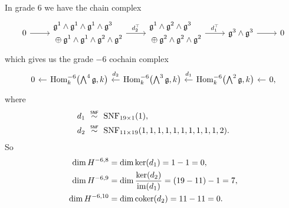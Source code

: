 In grade $6$ we have the chain complex
\[
  \begin{tikzcd}[ampersand replacement=\&]
    0 \ar[r] \& \begin{aligned} &\lie{g}^{1} \wedge \lie{g}^{1} \wedge \lie{g}^{1} \wedge \lie{g}^{3} \\ &\oplus \lie{g}^{1} \wedge \lie{g}^{1} \wedge \lie{g}^{2} \wedge \lie{g}^{2} \end{aligned} \ar[r,"d_{2}^{\top}"] \& \begin{aligned} &\lie{g}^{1} \wedge \lie{g}^{2} \wedge \lie{g}^{3} \\ &\oplus \lie{g}^{2} \wedge \lie{g}^{2} \wedge \lie{g}^{2} \end{aligned} \ar[r,"d_{1}^{\top}"] \& \lie{g}^{3} \wedge \lie{g}^{3} \ar[r] \& 0
  \end{tikzcd}
\]
which gives us the grade $-6$ cochain complex
\[
  \begin{tikzcd}[column sep=1em]
    0 & \ar[l] \Hom_{k}^{-6}\bigl( \bigwedge^{4}\lie{g}, k \bigr) & \ar[l,"d_{2}"' {yshift=2pt}] \Hom_{k}^{-6}\bigl( \bigwedge^{3}\lie{g}, k \bigr) & \ar[l,"d_{1}"' {yshift=2pt}] \Hom_{k}^{-6}\bigl( \bigwedge^{2}\lie{g}, k \bigr) & \ar[l] 0,
  \end{tikzcd}
\]
where
\begin{align*}
  d_{1} &\snfsim \SNF_{19\times1}(1), \\
  d_{2} &\snfsim \SNF_{11\times19}(1,1,1,1,1,1,1,1,1,1,2).
\end{align*}
So
\begin{align*}
  \dim H^{-6,8} &= \dim \operatorname{ker}(d_{1}) = 1-1 = 0, \\
  \dim H^{-6,9} &= \dim \dfrac{\operatorname{ker}(d_{2})}{\operatorname{im}(d_{1})} = (19-11) - 1 = 7, \\
  \dim H^{-6,10} &= \dim \operatorname{coker}(d_{2}) = 11 - 11 = 0.
\end{align*}

